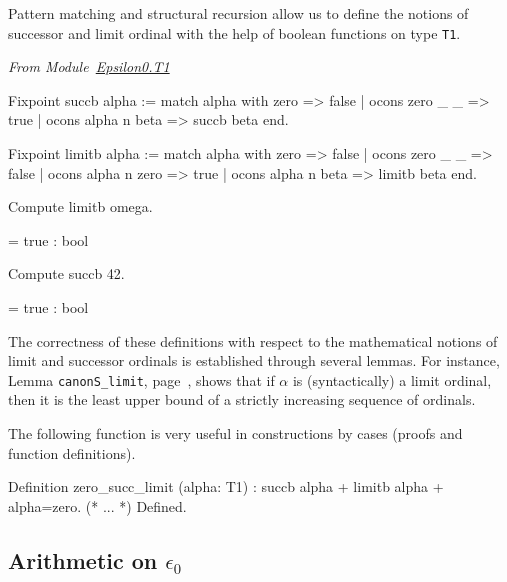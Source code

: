 \documentclass[a4paper]{book}
\begin{document}
Pattern matching and structural recursion allow us to define the notions of successor and limit ordinal with the help of  boolean functions on type \texttt{T1}. 

 \vspace{4pt}
\emph{From Module~\href{../src/html/hydras.Epsilon0.T1.html\#succb}{Epsilon0.T1}}

\begin{Coqsrc}
  Fixpoint succb alpha :=
  match alpha with
      zero => false
    | ocons zero _ _ => true
    | ocons alpha n beta => succb beta
  end.

Fixpoint limitb alpha :=
  match alpha with
      zero => false
    | ocons zero _ _ => false
    | ocons alpha n zero => true
    | ocons alpha n beta => limitb beta
  end.
\end{Coqsrc}



\begin{Coqsrc}
  Compute limitb omega.
\end{Coqsrc}

\begin{Coqanswer}
  = true
     : bool
\end{Coqanswer}

\begin{Coqsrc}
Compute succb 42.
\end{Coqsrc}

\begin{Coqanswer}
  = true
     : bool
   \end{Coqanswer}

The correctness of these definitions with respect to the mathematical notions of
limit and successor ordinals is established through several lemmas. For instance,
Lemma \texttt{canonS\_limit}, page~\pageref{lemma:canonS-limit}, shows that
if $\alpha$ is (syntactically) a limit ordinal, then it is the least upper bound of
a strictly increasing sequence of ordinals.


   The following function is very useful in constructions by cases (proofs and function definitions).
   
\begin{Coqsrc}
Definition zero_succ_limit (alpha: T1) :
    {succb alpha} + {limitb alpha} +  {alpha=zero}.
    (* ... *)
Defined.
\end{Coqsrc}



\subsection{Arithmetic on \texorpdfstring{$\epsilon_0$}{epsilon0}}
\end{document}
